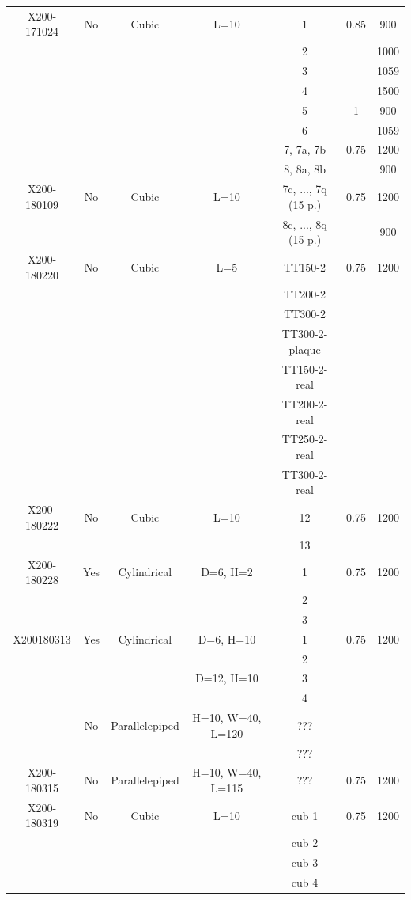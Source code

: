 \begin{center}
\begin{longtable}{@{\extracolsep{\fill}}*{7}{|c}|@{}}
  X200-171024 & No & Cubic & L=10& 1 & 0.85 & 900\\
  & &   & & 2 &  & 1000\\
  & &   & & 3&  & 1059\\
  & &  & & 4&  & 1500\\
  & &  & & 5& 1 & 900\\
  & &  & & 6&  & 1059\\
  & & & & 7, 7a, 7b & 0.75 & 1200\\
  & & & & 8, 8a, 8b& & 900\\
\hline  
  X200-180109 & No&Cubic & L=10 & 7c, ..., 7q (15 p.)& 0.75 &1200\\
  & & & & 8c, ..., 8q (15 p.)  & & 900\\
\hline  
  X200-180220 & No & Cubic & L=5 & TT150-2 & 0.75 & 1200\\
  & &  & & TT200-2 &  &\\
  & &  & & TT300-2 &  &\\
  & &  & & TT300-2-plaque &  &\\
  & &  & & TT150-2-real &  &\\
  & &  & & TT200-2-real &  &\\
  & &  & & TT250-2-real &  &\\
  & &  & & TT300-2-real &  &\\
\hline  
  X200-180222 & No & Cubic & L=10 &12& 0.75 & 1200\\
  & &  & &13 &  &\\
\hline  
  X200-180228  & Yes & Cylindrical & D=6, H=2 &1 & 0.75 & 1200\\
  & &  &  & 2&  & \\
  & &  &  & 3 &  & \\
\hline  
  X200180313 & Yes & Cylindrical & D=6, H=10&1& 0.75 & 1200\\
    & &    & &2 & &  \\
    & &  &D=12, H=10 &3& &  \\
    & & & &4 & & \\
    & No & Parallelepiped & H=10, W=40, L=120 & ??? & &\\
        &  & & & ??? & &\\
\hline  
  X200-180315 & No & Parallelepiped & H=10, W=40, L=115& ??? & 0.75 & 1200\\
  \hline
  X200-180319  & No & Cubic & L=10 & cub 1 & 0.75 & 1200\\
  & &  & & cub 2 & &\\
  & &  & & cub 3 & &\\
  & & & & cub 4 & &\\

\end{longtable}
\end{center}
